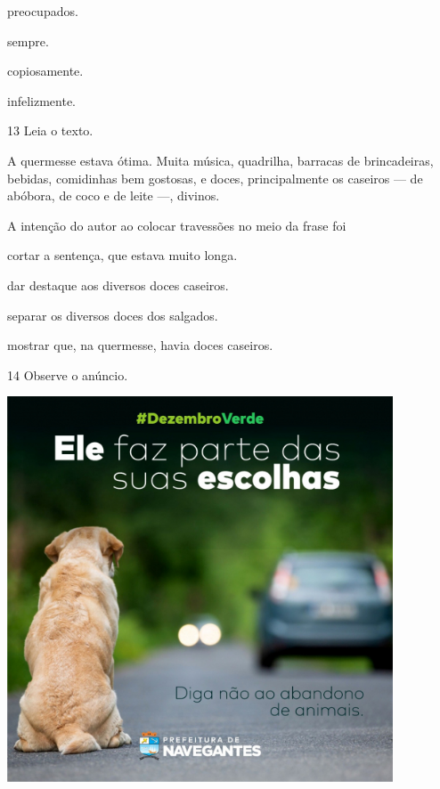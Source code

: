 \begin{escolha}
\item preocupados.

\item sempre.

\item copiosamente.

\item infelizmente.
\end{escolha}

\num{13} Leia o texto.

\begin{myquote}
A quermesse estava ótima. Muita música, quadrilha, barracas de
brincadeiras, bebidas, comidinhas bem gostosas, e doces, principalmente
os caseiros --- de abóbora, de coco e de leite ---, divinos.
\end{myquote}

A intenção do autor ao colocar travessões no meio da frase foi

\begin{escolha}
\item cortar a sentença, que estava muito longa.

\item dar destaque aos diversos doces caseiros.

\item separar os diversos doces dos salgados.

\item mostrar que, na quermesse, havia doces caseiros.
\end{escolha}

\num{14} Observe o anúncio.

\includegraphics[width=4.50972in,height=4.50972in]{./media/simulados/image6.png}

